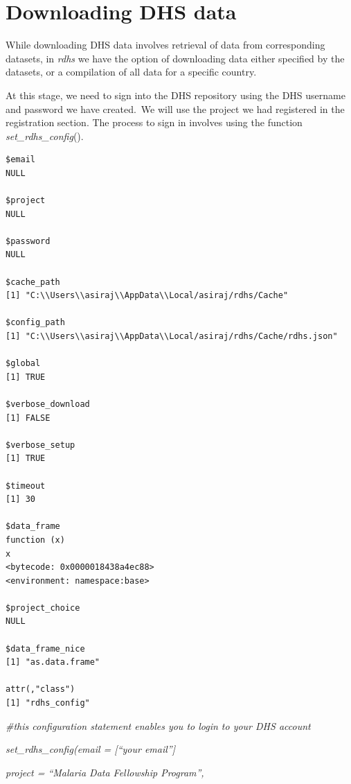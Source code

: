 \documentclass[
  letterpaper,
  DIV=11,
  numbers=noendperiod]{scrreprt}
\begin{document}

\hypertarget{downloading-dhs-data}{%
\chapter{Downloading DHS data}\label{downloading-dhs-data}}

While downloading DHS data involves retrieval of data from corresponding
datasets, in \emph{rdhs} we have the option of downloading data either
specified by the datasets, or a compilation of all data for a specific
country.

At this stage, we need to sign into the DHS repository using the DHS
username and password we have created.~We will use the project we had
registered in the registration section. The process to sign in involves
using the function \emph{set\_rdhs\_config}().

\begin{verbatim}
$email
NULL

$project
NULL

$password
NULL

$cache_path
[1] "C:\\Users\\asiraj\\AppData\\Local/asiraj/rdhs/Cache"

$config_path
[1] "C:\\Users\\asiraj\\AppData\\Local/asiraj/rdhs/Cache/rdhs.json"

$global
[1] TRUE

$verbose_download
[1] FALSE

$verbose_setup
[1] TRUE

$timeout
[1] 30

$data_frame
function (x) 
x
<bytecode: 0x0000018438a4ec88>
<environment: namespace:base>

$project_choice
NULL

$data_frame_nice
[1] "as.data.frame"

attr(,"class")
[1] "rdhs_config"
\end{verbatim}

\emph{\#this configuration statement enables you to login to your DHS
account}

\emph{set\_rdhs\_config(email = {[}``your email''{]}}

\emph{project = ``Malaria Data Fellowship Program'',}
\end{document}
